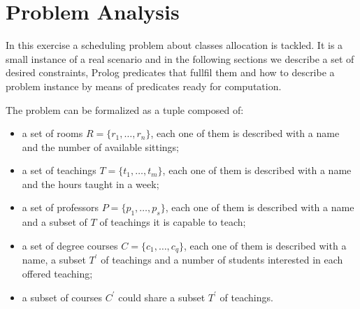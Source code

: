 \documentclass[10pt,a4paper]{article} %
\begin{document}
    \title{\rmfamily\normalfont{}}
    \author{}
    \date{\today}

    \maketitle

    \begin{abstract}
        This short document explains my work to support
        AI exam, taught by Prof. Paolo Frasconi at University of Florence,
        comments some results and shows how to reproduce test cases.
        I implemented a Prolog program that produce a schedule for the
        problem at hand, satisfying the requested constraints.
    \end{abstract}


    \section{Problem Analysis}
    In this exercise a scheduling problem about classes allocation
    is tackled. It is a small instance of a real scenario
    and in the following sections we describe a set of desired constraints,
    Prolog predicates that fullfil them and how to describe a problem
    instance by means of predicates ready for computation.

    The problem can be formalized as a tuple composed of:
    \begin{itemize}
        \item a set of rooms $R = \lbrace r_1, \ldots, r_n \rbrace$, each
            one of them is described with a name and the number
            of available sittings;
        \item a set of teachings $T = \lbrace t_1, \ldots, t_m \rbrace$, each
            one of them is described with a name and the hours taught in a week;
        \item a set of professors $P = \lbrace p_1, \ldots, p_s \rbrace$, each
            one of them is described with a name and a subset of $T$ of teachings
            it is capable to teach;
        \item a set of degree courses $C = \lbrace c_1, \ldots, c_q \rbrace$, each
            one of them is described with a name, a subset $T^\prime$ of teachings
            and a number of students interested in each offered teaching;
        \item a subset of courses $C^\prime$ could share a subset $T^\prime$ of teachings.
    \end{itemize}
\end{document}
